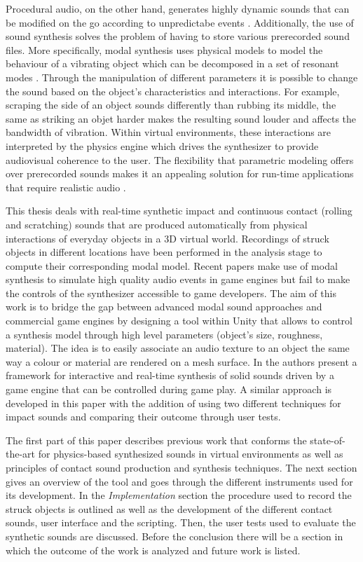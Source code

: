 Procedural audio, on the other hand, generates highly dynamic sounds that can be modified on the go according to unpredictabe events \cite{farnell2010designing}. Additionally, the use of sound synthesis solves the problem of having to store various prerecorded sound files. More specifically, modal synthesis uses physical models to model the behaviour of a vibrating object which can be decomposed in a set of resonant modes \cite{bilbao2009numerical}. Through the manipulation of different parameters it is possible to change the sound based on the object's characteristics and interactions. For example, scraping the side of an object sounds differently than rubbing its middle, the same as striking an objet harder makes the resulting sound louder and affects the bandwidth of vibration. Within virtual environments, these interactions are interpreted by the physics engine which drives the synthesizer to provide audiovisual coherence to the user.  The flexibility that parametric modeling offers over prerecorded sounds makes it an appealing solution for run-time applications that require realistic audio \cite{Cook:2002:RSS:515316}. 

This thesis deals with real-time synthetic impact and continuous contact (rolling and scratching) sounds that are produced automatically from physical interactions of everyday objects in a 3D virtual world. Recordings of struck objects in different locations have been performed in the analysis stage to compute their corresponding modal model. Recent papers \cite{lloyd2011sound, bonneel2008fast} make use of modal synthesis to simulate high quality audio events in game engines but fail to make the controls of the synthesizer accessible to game developers. The aim of this work is to bridge the gap between advanced modal sound approaches and commercial game engines by designing a tool within Unity\textsuperscript{\textregistered} that allows to control a synthesis model through high level parameters (object's size, roughness, material). The idea is to easily associate an audio texture to an object the same way  a colour or material are rendered on a mesh surface. In \cite{pruvost2015perception} the authors present a framework for interactive and real-time synthesis of solid sounds driven by a game engine that can be controlled during game play. A similar approach is developed in this paper with the addition of using two different techniques for impact sounds and comparing their outcome through user tests. 

The first part of this paper describes previous work that conforms the state-of-the-art for physics-based synthesized sounds in virtual environments as well as principles of contact sound production and synthesis techniques. The next section gives an overview of the tool and goes through the different instruments used for its development. In the \textit{Implementation} section the procedure used to record the struck objects is outlined as well as the development of the different contact sounds, user interface and the scripting. Then, the user tests used to evaluate the synthetic sounds are discussed. Before the conclusion there will be a section in which the outcome of the work is analyzed and future work is listed.

